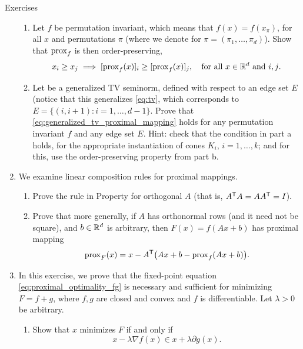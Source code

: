 \begin{xcb}{Exercises}
\begin{enumerate}[label=\thechapter.\arabic*]
\begin{enumerate}[label=\alph*.]
\item Let $f$ be permutation invariant, which means that $f(x) = f(x_\pi)$, for
  all $x$ and permutations $\pi$ (where we denote  for $\pi=(\pi_1,\ldots,\pi_d)$). Show that $\operatorname{prox}_f$ is
  then order-preserving,  
 \[
 x_i \geq x_j \implies [\operatorname{prox}_f(x)]_i \geq [\operatorname{prox}_f(x)]_j, \quad \text{for all
   $x \in \mathbb{R}^d$ and $i,j$}.
 \]

\item Let  be a
  generalized TV seminorm, defined with respect to an edge set $E$ (notice that  
  this generalizes \eqref{eq:tv}, which corresponds to $E = \{(i, i+1) : i =
  1,\ldots,d-1\}$. Prove that \eqref{eq:generalized_tv_proximal_mapping} holds
  for any permutation invariant $f$ and any edge set $E$. Hint: check that the
  condition in part a holds, for the appropriate instantiation of cones $K_i$,
  $i=1,\ldots,k$; and for this, use the order-preserving property from part b.   
\end{enumerate}

\item \label{ex:proximal_linear}
  We examine linear composition rules for proximal mappings. 

\begin{enumerate}[label=\alph*.]
\item Prove the rule in Property  for orthogonal $A$
  (that is, $A^{\mathsf{T}} A = A A^{\mathsf{T}} = I$).   

\item Prove that more generally, if $A$ has orthonormal rows (and it need not be 
  square), and $b \in \mathbb{R}^d$ is arbitrary, then $F(x) = f(Ax + b)$ has proximal
  mapping 
  \[
  \operatorname{prox}_F(x)  = x - A^{\mathsf{T}} \big(Ax + b - \operatorname{prox}_f(Ax + b) \big).
  \]
\end{enumerate}
  
\item \label{ex:proximal_optimality_fg}
  In this exercise, we prove that the fixed-point equation 
  \eqref{eq:proximal_optimality_fg} is necessary and sufficient for minimizing
  $F = f+g$, where $f,g$ are closed and convex and $f$ is differentiable. Let
  $\lambda > 0$ be arbitrary.

\begin{enumerate}[label=\alph*.]
\item Show that $x$ minimizes $F$ if and only if
  \[
  x - \lambda \nabla f(x) \in x + \lambda \partial g(x).
  \]
  

\end{enumerate}
\end{enumerate}
\end{xcb}
